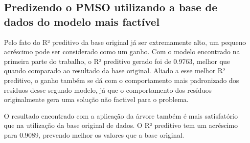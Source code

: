 \documentclass[
]{article}
\newenvironment{Shaded}{\begin{snugshade}}{\end{snugshade}}
\newcommand{\ControlFlowTok}[1]{\textcolor[rgb]{0.13,0.29,0.53}{\textbf{#1}}}
\newcommand{\DataTypeTok}[1]{\textcolor[rgb]{0.13,0.29,0.53}{#1}}
\newcommand{\DecValTok}[1]{\textcolor[rgb]{0.00,0.00,0.81}{#1}}
\newcommand{\KeywordTok}[1]{\textcolor[rgb]{0.13,0.29,0.53}{\textbf{#1}}}
\newcommand{\NormalTok}[1]{#1}
\newcommand{\OperatorTok}[1]{\textcolor[rgb]{0.81,0.36,0.00}{\textbf{#1}}}
\newcommand{\OtherTok}[1]{\textcolor[rgb]{0.56,0.35,0.01}{#1}}
\newcommand{\StringTok}[1]{\textcolor[rgb]{0.31,0.60,0.02}{#1}}
\begin{document}
\hypertarget{predizendo-o-pmso-utilizando-a-base-de-dados-do-modelo-mais-factuxedvel}{%
\subsection{Predizendo o PMSO utilizando a base de dados do modelo mais
factível}\label{predizendo-o-pmso-utilizando-a-base-de-dados-do-modelo-mais-factuxedvel}}

Pelo fato do R² preditivo da base original já ser extremamente alto, um
pequeno acréscimo pode ser considerado como um ganho. Com o modelo
encontrado na primeira parte do trabalho, o R² preditivo gerado foi de
0.9763, melhor que quando comparado ao resultado da base original.
Aliado a esse melhor R² preditivo, o ganho também se dá com o
comportamento mais padronizado dos resíduos desse segundo modelo, já que
o comportamento dos resíduos originalmente gera uma solução não factivel
para o problema.

O resultado encontrado com a aplicação da árvore também é mais
satisfatório que na utilização da base original de dados. O R² preditivo
tem um acréscimo para 0.9089, prevendo melhor os valores que a base
original.

\begin{Shaded}
\end{Shaded}
\end{document}
